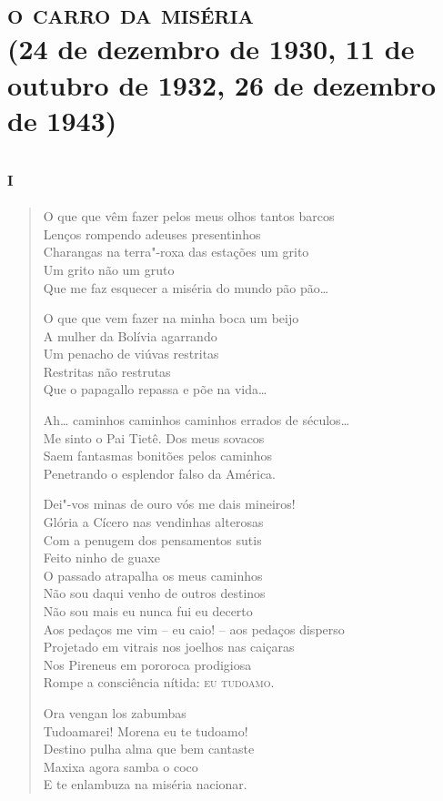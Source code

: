 \part[o carro da miséria]{\textsc{o carro da miséria}\\{\large (24 de dezembro de 1930, 11 de outubro de 1932, 26 de dezembro de 1943)}}
\removeepigraph

\chapter[«O que que vêm fazer pelos meus olhos tantos barcos»]{\textsc{i}}

\begin{verse}
O que que vêm fazer pelos meus olhos tantos barcos\\
Lenços rompendo adeuses presentinhos\\
Charangas na terra"-roxa das estações um grito\\
Um grito não um gruto\\
Que me faz esquecer a miséria do mundo pão pão\ldots{}

O que que vem fazer na minha boca um beijo\\
A mulher da Bolívia agarrando\\
Um penacho de viúvas restritas\\
Restritas não restrutas\\
Que o papagallo repassa e põe na vida\ldots{}

Ah\ldots{} caminhos caminhos caminhos errados de séculos\ldots{}\\
Me sinto o Pai Tietê. Dos meus sovacos\\
Saem fantasmas bonitões pelos caminhos\\
Penetrando o esplendor falso da América.

Dei"-vos minas de ouro vós me dais mineiros!\\
Glória a Cícero nas vendinhas alterosas\\
Com a penugem dos pensamentos sutis\\
Feito ninho de guaxe\\
O passado atrapalha os meus caminhos\\
Não sou daqui venho de outros destinos\\
Não sou mais eu nunca fui eu decerto\\
Aos pedaços me vim -- eu caio! -- aos pedaços disperso\\
Projetado em vitrais nos joelhos nas caiçaras\\
Nos Pireneus em pororoca prodigiosa\\
Rompe a consciência nítida: \textsc{eu tudoamo.}

Ora vengan los zabumbas\\
Tudoamarei! Morena eu te tudoamo!\\
Destino pulha alma que bem cantaste\\
Maxixa agora samba o coco\\
E te enlambuza na miséria nacionar.
\end{verse}

